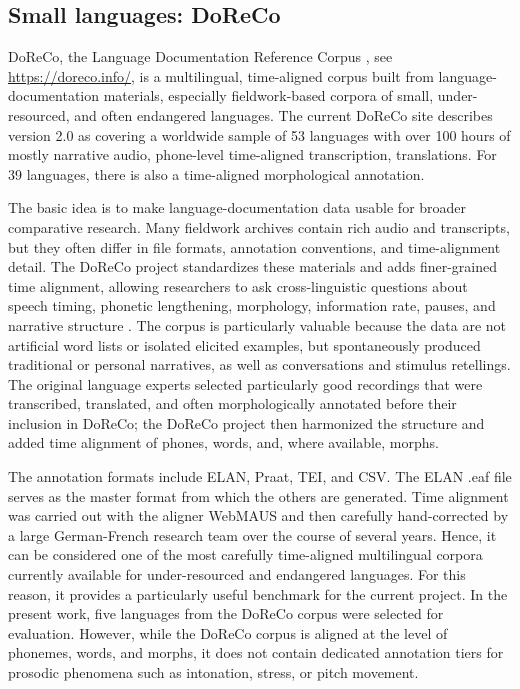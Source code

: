 \subsection{Small languages: DoReCo}

DoReCo, the Language Documentation Reference Corpus \cite{paschen2020doreco}, see \url{https://doreco.info/}, is a multilingual, time-aligned corpus built from language-documentation materials, especially fieldwork-based corpora of small, under-resourced, and often endangered languages. The current DoReCo site describes version 2.0 as covering a worldwide sample of 53 languages with over 100 hours of  mostly narrative audio, phone-level time-aligned transcription, translations. For 39 languages, there is also a time-aligned morphological annotation. 

The basic idea is to make language-documentation data usable for broader comparative research. Many fieldwork archives contain rich audio and transcripts, but they often differ in file formats, annotation conventions, and time-alignment detail. The DoReCo project standardizes these materials and adds finer-grained time alignment, allowing researchers to ask cross-linguistic questions about speech timing, phonetic lengthening, morphology, information rate, pauses, and narrative structure \cite{paschen2020doreco}. The corpus is particularly valuable because the data are not artificial word lists or isolated elicited examples, but spontaneously produced traditional or personal narratives, as well as conversations and stimulus retellings. The original language experts selected particularly good recordings that were transcribed, translated, and often morphologically annotated before their inclusion in DoReCo; the DoReCo project then harmonized the structure and added time alignment of phones, words, and, where available, morphs. 

The annotation formats include ELAN, Praat, TEI, and CSV. The ELAN .eaf file serves as the master format from which the others are generated. Time alignment was carried out with the aligner WebMAUS \cite{kisler2012webmaus} and then carefully hand-corrected by a large German-French research team over the course of several years. Hence, it can be considered one of the most carefully time-aligned multilingual corpora currently available for under-resourced and endangered languages. For this reason, it provides a particularly useful benchmark for the current project. In the present work, five languages from the DoReCo corpus were selected for evaluation. However, while the DoReCo corpus is aligned at the level of phonemes, words, and morphs, it does not contain dedicated annotation tiers for prosodic phenomena such as intonation, stress, or pitch movement.

